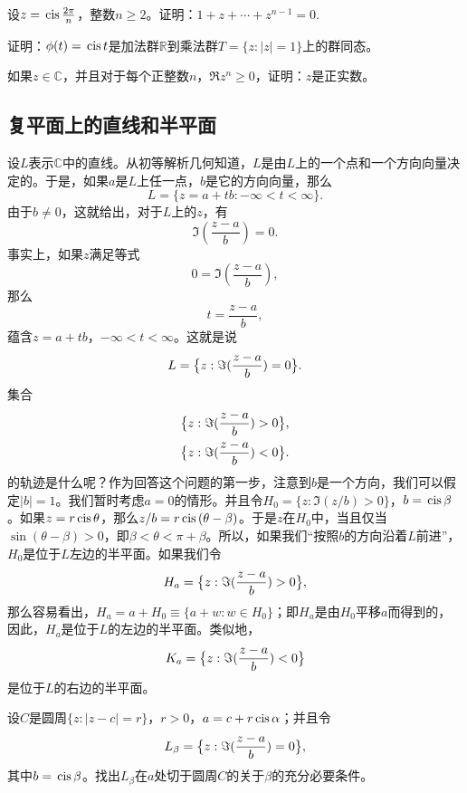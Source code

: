 \begin{exercise}
设$z=\,\text{cis}\,{\frac{2\pi}{n}}$，整数$n \ge 2$。证明：$1+z+\cdots+z^{n-1}=0$.
\end{exercise}

\begin{exercise}
证明：$\phi(t)=\,\text{cis}\,{t}$是加法群$\mathbb{R}$到乘法群$T=\{z:|z|=1\}$上的群同态。
\end{exercise}

\begin{exercise}
如果$z \in \mathbb{C}$，并且对于每个正整数$n$，$\Re{z^n} \ge 0$，证明：$z$是正实数。
\end{exercise}

\subsection{复平面上的直线和半平面}\label{subsection0020105}
设$L$表示$\mathbb{C}$中的直线。从初等解析几何知道，$L$是由$L$上的一个点和一个方向向量决定的。于是，如果$a$是$L$上任一点，$b$是它的方向向量，那么
\[
L = \{z = a+tb:-\infty < t < \infty\}.
\]
由于$b \neq 0$，这就给出，对于$L$上的$z$，有
\[
\Im{(\frac{z-a}{b})} = 0.
\]
事实上，如果$z$满足等式
\[
0 = \Im{(\frac{z-a}{b})},
\]
那么
\[
t = \frac{z-a}{b},
\]
蕴含$z = a + tb$，$-\infty < t < \infty$。这就是说
\begin{gather}\label{equ002010501}
L = \big{\{} z: \Im{(\frac{z-a}{b})} = 0 \big{\}}.
\end{gather}
集合
\[
\begin{aligned}
&\big{\{} z: \Im{(\frac{z-a}{b})} > 0 \big{\}},\\
&\big{\{} z: \Im{(\frac{z-a}{b})} < 0 \big{\}}.
\end{aligned}
\]
的轨迹是什么呢？作为回答这个问题的第一步，注意到$b$是一个方向，我们可以假定$|b|=1$。我们暂时考虑$a=0$的情形。并且令$H_0=\{z:\Im{(z/b)}>0\}$，$b = \,\text{cis}\,{\beta}$。如果$z = r\,\text{cis}\,{\theta}$，那么$z/b = r\,\text{cis}\,{(\theta-\beta)}$。于是$z$在$H_0$中，当且仅当$\sin(\theta-\beta)>0$，即$\beta < \theta < \pi + \beta$。所以，如果我们“按照$b$的方向沿着$L$前进”，$H_0$是位于$L$左边的半平面。如果我们令
\[
H_a = \big{\{} z: \Im{(\frac{z-a}{b})} > 0 \big{\}},
\]
那么容易看出，$H_a = a + H_0 \equiv \{ a + w: w \in H_0\}$；即$H_a$是由$H_0$平移$a$而得到的，因此，$H_a$是位于$L$的左边的半平面。类似地，
\[
K_a = \big{\{} z: \Im{(\frac{z-a}{b})} < 0 \big{\}}
\]
是位于$L$的右边的半平面。

\begin{exercise}
设$C$是圆周$\{z:|z-c|=r\}$，$r > 0$，$a = c + r\,\text{cis}\,{\alpha}$；并且令
\[
L_{\beta} = \big{\{} z: \Im{(\frac{z-a}{b})} = 0 \big{\}},
\]
其中$b=\,\text{cis}\,{\beta}$。找出$L_{\beta}$在$a$处切于圆周$C$的关于$\beta$的充分必要条件。
\end{exercise}

